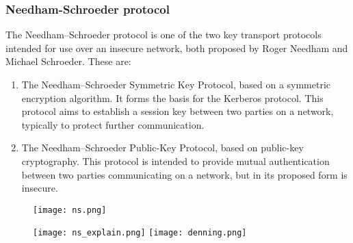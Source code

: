 \documentclass{article}
\begin{document}
\subsubsection{Needham-Schroeder protocol}
The Needham–Schroeder protocol is one of the two key transport protocols intended for use over an insecure network, both proposed by Roger Needham and Michael Schroeder. These are:
\begin{enumerate}
    \item The Needham–Schroeder Symmetric Key Protocol, based on a symmetric encryption algorithm. It forms the basis for the Kerberos protocol. This protocol aims to establish a session key between two parties on a network, typically to protect further communication.
    \item     The Needham–Schroeder Public-Key Protocol, based on public-key cryptography. This protocol is intended to provide mutual authentication between two parties communicating on a network, but in its proposed form is insecure.
\end{enumerate}
\begin{figure} [H]
    \centering
    \texttt{[image: ns.png]}
\end{figure}
\begin{figure} [H]
    \centering
    \texttt{[image: ns\_explain.png]}
    \texttt{[image: denning.png]}
\end{figure}
\end{document}

